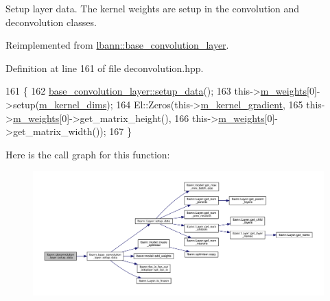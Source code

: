 Setup layer data. The kernel weights are setup in the convolution and deconvolution classes. 

Reimplemented from \hyperlink{classlbann_1_1base__convolution__layer_a9f850c1bdf4ae3cd986411d3cb3a524c}{lbann\+::base\+\_\+convolution\+\_\+layer}.



Definition at line 161 of file deconvolution.\+hpp.


\begin{DoxyCode}
161                              \{
162     \hyperlink{classlbann_1_1base__convolution__layer_a9f850c1bdf4ae3cd986411d3cb3a524c}{base\_convolution\_layer::setup\_data}();
163     this->\hyperlink{classlbann_1_1Layer_a7954e30fbf9100a6ba4b56d02767a469}{m\_weights}[0]->setup(\hyperlink{classlbann_1_1base__convolution__layer_a283edb6a476f975e713d0b4235ac658f}{m\_kernel\_dims});
164     El::Zeros(this->\hyperlink{classlbann_1_1base__convolution__layer_a4129f11df61ed92bcad24ae855d7bd11}{m\_kernel\_gradient},
165               this->\hyperlink{classlbann_1_1Layer_a7954e30fbf9100a6ba4b56d02767a469}{m\_weights}[0]->get\_matrix\_height(),
166               this->\hyperlink{classlbann_1_1Layer_a7954e30fbf9100a6ba4b56d02767a469}{m\_weights}[0]->get\_matrix\_width());
167   \}
\end{DoxyCode}
Here is the call graph for this function\+:\nopagebreak
\begin{figure}[H]
\begin{center}
\leavevmode
\includegraphics[width=350pt]{classlbann_1_1deconvolution__layer_a6d891396ea1c91030cd647cc111c8c5f_cgraph}
\end{center}
\end{figure}
\mbox{\label{classlbann_1_1deconvolution__layer_abec9b66f0659fd4f06a39a1e8c4bd06b}} 
